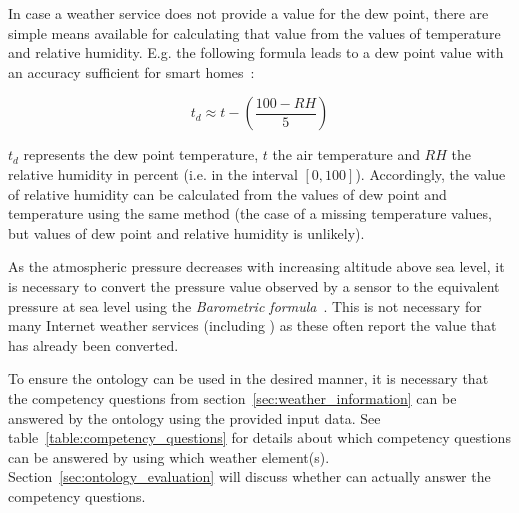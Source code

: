 In case a weather service does not provide a value for the dew point, there are simple means available for calculating that value from the values of temperature and relative humidity. E.g. the following formula leads to a dew point value with an accuracy sufficient for smart homes~\cite{dew_point_calculation}:

\[t_d \approx t-\left(\frac{100-RH}{5}\right)\]

$t_d$ represents the dew point temperature, $t$ the air temperature and $RH$ the relative humidity in percent (i.e. in the interval $[0,100]$). Accordingly, the value of relative humidity can be calculated from the values of dew point and temperature using the same method (the case of a missing temperature values, but values of dew point and relative humidity is unlikely).

As the atmospheric pressure decreases with increasing altitude above sea level, it is necessary to convert the pressure value observed by a sensor to the equivalent pressure at sea level using the \emph{Barometric formula}~\cite{us76_standard_atmosphere}.
This is not necessary for many Internet weather services (including \yrno) as these often report the value that has already been converted.

To ensure the ontology can be used in the desired manner, it is necessary that the competency questions from section~\ref{sec:weather_information} can be answered by the ontology using the provided input data. See table~\ref{table:competency_questions} for details about which competency questions can be answered by using which weather element(s). Section~\ref{sec:ontology_evaluation} will discuss whether \smarthomeweather can actually answer the competency questions.

